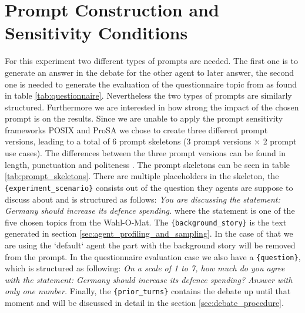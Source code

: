


\section{Prompt Construction and Sensitivity 
Conditions}

For this experiment two different types of prompts are needed. The first one is to generate an answer in the debate for the other agent to later answer, the second one is needed to generate the evaluation of the questionnaire topic from as found in table \ref{tab:questionnaire}. Nevertheless the two types of prompts are similarly structured. Furthermore we are interested in how strong the impact of the chosen prompt is on the results. Since we are unable to apply the prompt sensitivity frameworks POSIX \citep{chatterjee2024posix} and ProSA \citep{zhuo2024prosa} we chose to create three different prompt versions, leading to a total of 6 prompt skeletons (3 prompt versions $\times$ 2 prompt use cases). The differences between the three prompt versions can be found in length, punctuation \cite{sclar2023quantifying} and politeness \cite{yin2024should}. The prompt skeletons can be seen in table \ref{tab:prompt_skeletons}. There are multiple placeholders in the skeleton, the \texttt{\{experiment\_scenario\}} consists out of the question they agents are suppose to discuss about and is structured as follows: \textit{You are discussing the statement: Germany should increase its defence spending.} where the statement is one of the five chosen topics from the Wahl-O-Mat. The \texttt{\{background\_story\}} is the text generated in section \ref{sec:agent_profiling_and_sampling}. In the case of that we are using the `default` agent the part with the background story will be removed from the prompt. In the questionnaire evaluation case we also have a \texttt{\{question\}}, which is structured as following: \textit{On a scale of 1 to 7, how much do you agree with the statement: Germany should increase its defence spending? Answer with only one number.} Finally, the \texttt{\{prior\_turns\}} contains the debate up until that moment and will be discussed in detail in the section \ref{sec:debate_procedure}.




